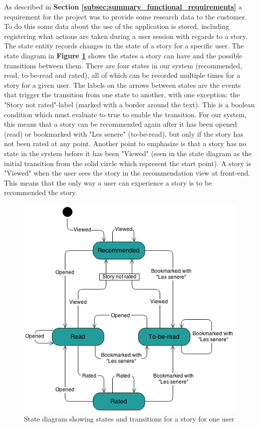 As described in \textbf{Section \ref{subsec:summary_functional_requirements}} a requirement for the project was to provide some research data to the customer. To do this some data about the use of the application is stored, including registering what actions are taken during a user session with regards to a story. The state entity records changes in the state of a story for a specific user. The state diagram in \textbf{Figure \ref{Fig:state_diagram}} shows the states a story can have and the possible transitions between them. There are four states in our system (recommended, read, to-be-read and rated), all of which can be recorded multiple times for a story for a given user. The labels on the arrows between states are the events that trigger the transition from one state to another, with one exception: the "Story not rated"-label (marked with a border around the text). This is a boolean condition which must evaluate to true to enable the transition. For our system, this means that a story can be recommended again after it has been opened (read) or bookmarked with "Les senere" (to-be-read), but only if the story has not been rated at any point. Another point to emphasize is that a story has no state in the system before it has been "Viewed" (seen in the state diagram as the initial transition from the solid circle which represent the start point). A story is "Viewed" when the user sees the story in the recommendation view at front-end. This means that the only way a user can experience a story is to be recommended the story. 

\begin{figure}[h!]
	\centering
	\includegraphics[height=11cm]{fig/state_diagram}
	\caption{State diagram showing states and transitions for a story for one user}
	\label{Fig:state_diagram}
\end{figure}


